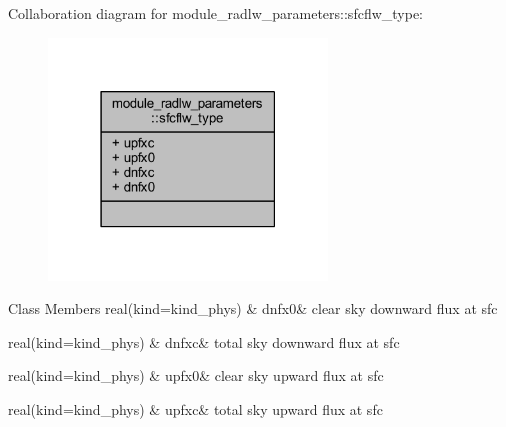 Collaboration diagram for module\+\_\+radlw\+\_\+parameters\+:\+:sfcflw\+\_\+type\+:\nopagebreak
\begin{figure}[H]
\begin{center}
\leavevmode
\includegraphics[width=210pt]{structmodule__radlw__parameters_1_1sfcflw__type__coll__graph}
\end{center}
\end{figure}
\begin{DoxyFields}{Class Members}
real(kind=kind\+\_\+phys)\hypertarget{namespacemodule__radlw__parameters_adac8d084ff59310f6c6f4fdff1a0e5e6}{}\label{namespacemodule__radlw__parameters_adac8d084ff59310f6c6f4fdff1a0e5e6}
&
dnfx0&
clear sky downward flux at sfc \\
\hline

real(kind=kind\+\_\+phys)\hypertarget{namespacemodule__radlw__parameters_ae65c0014042ceffec4293e4d300f9cb8}{}\label{namespacemodule__radlw__parameters_ae65c0014042ceffec4293e4d300f9cb8}
&
dnfxc&
total sky downward flux at sfc \\
\hline

real(kind=kind\+\_\+phys)\hypertarget{namespacemodule__radlw__parameters_ab186f43f5f87043de996c1fa6f59dc6e}{}\label{namespacemodule__radlw__parameters_ab186f43f5f87043de996c1fa6f59dc6e}
&
upfx0&
clear sky upward flux at sfc \\
\hline

real(kind=kind\+\_\+phys)\hypertarget{namespacemodule__radlw__parameters_ab281301c9fad950c86a379cdec0963aa}{}\label{namespacemodule__radlw__parameters_ab281301c9fad950c86a379cdec0963aa}
&
upfxc&
total sky upward flux at sfc \\
\hline

\end{DoxyFields}
\label{structmodule__radlw__parameters_1_1proflw__type}
\hypertarget{namespacemodule__radlw__parameters_structmodule__radlw__parameters_1_1proflw__type}{}
